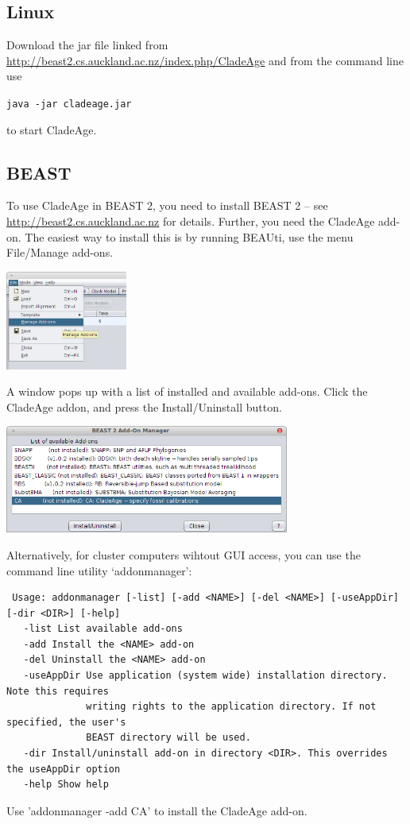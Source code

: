 \documentclass{article}
\begin{document}
\subsection{Linux}
Download the jar file linked from
\url{http://beast2.cs.auckland.ac.nz/index.php/CladeAge}
and from the command line use

{\tt java -jar cladeage.jar}

to start CladeAge.

\subsection{BEAST}

To use CladeAge in BEAST 2, you need
to install BEAST 2 -- see \url{http://beast2.cs.auckland.ac.nz} for details.
Further, you need the CladeAge add-on. The easiest way to install this
is by running BEAUti, use the menu File/Manage add-ons. 
\begin{center}\includegraphics[width=0.3\textwidth]{fileManageAddOns.png}\end{center}
A window pops up
with a list of installed and available add-ons. Click the CladeAge addon, and 
press the Install/Uninstall button.
\begin{center}\includegraphics[width=0.7\textwidth]{addonmanager.png}\end{center}

Alternatively, for cluster computers wihtout GUI access, you can use the 
command line utility `addonmanager':

\begin{verbatim}
 Usage: addonmanager [-list] [-add <NAME>] [-del <NAME>] [-useAppDir] [-dir <DIR>] [-help] 
   -list List available add-ons
   -add Install the <NAME> add-on 
   -del Uninstall the <NAME> add-on 
   -useAppDir Use application (system wide) installation directory. Note this requires 
              writing rights to the application directory. If not specified, the user's 
              BEAST directory will be used.
   -dir Install/uninstall add-on in directory <DIR>. This overrides the useAppDir option
   -help Show help
\end{verbatim}
Use 'addonmanager -add CA' to install the CladeAge add-on.
\end{document}
